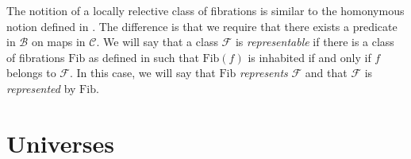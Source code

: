 \documentclass[reqno]{amsart}
\theoremstyle{definition}
\theoremstyle{remark}
\newcommand{\fs}[1]{\mathrm{#1}}
\newcommand{\scat}[1]{\mathcal{#1}}
\newcommand{\Fib}{\mathcal{F}}
\numberwithin{figure}{section}
\begin{document}
The notition of a locally relective class of fibrations is similar to the homonymous notion defined in \cite[Subsection~10.1]{indexed-tt}.
The difference is that we require that there exists a predicate in $\scat{B}$ on maps in $\scat{C}$.
We will say that a class $\Fib$ is \emph{representable} if there is a class of fibrations $\fs{Fib}$ as defined in \cite[Subsection~9.2]{indexed-tt} such that $\fs{Fib}(f)$ is inhabited if and only if $f$ belongs to $\Fib$.
In this case, we will say that $\fs{Fib}$ \emph{represents} $\Fib$ and that $\Fib$ is \emph{represented} by $\fs{Fib}$.


\section{Universes}




\end{document}
